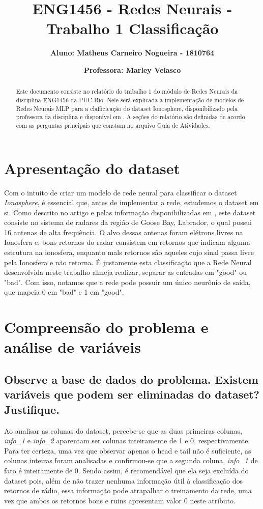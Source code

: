 \documentclass[12pt]{article}
\title{\textbf{ENG1456 - Redes Neurais - Trabalho 1 Classificação}}
\author{\textbf{Aluno: Matheus Carneiro Nogueira - 1810764}}
\affil{}
\author{\textbf{Professora: Marley Velasco}}
\affil{}
\date{}
\begin{document}
	\maketitle
	\tableofcontents
	
\begin{abstract}
	Este documento consiste no relatório do trabalho 1 do módulo de Redes Neurais da disciplina ENG1456 da PUC-Rio. Nele será explicada a implementação de modelos de Redes Neurais MLP para a clafficicação do dataset Ionosphere, disponibilizado pela professora da disciplina e disponível em \cite{Dataset}. A seções do relatório são definidas de acordo com as perguntas principais que constam no arquivo Guia de Atividades.
\end{abstract}

\section{Apresentação do dataset}\label{sec:apresentacao}

Com o intuito de criar um modelo de rede neural para classificar o dataset \textit{Ionosphere}, é essencial que, antes de implementar a rede, estudemos o dataset em si. Como descrito no artigo \cite{Paper1989} e pelas informação disponibilizadas em \cite{Dataset}, este dataset consiste no sistema de radares da região de Goose Bay, Labrador, o qual possui 16 antenas de alta frequência. O alvo dessas antenas foram elétrons livres na Ionosfera e, bons retornos do radar consistem em retornos que indicam alguma estrutura na ionosfera, enquanto mals retornos são aqueles cujo sinal passa livre pela Ionosfera e não retorna. É justamente esta classificação que a Rede Neural desenvolvida neste trabalho almeja realizar, separar as entradas em "good" ou "bad". Com isso, notamos que a rede pode possuir um único neurônio de saída, que mapeia 0 em "bad" e 1 em "good".

\section{Compreensão do problema e análise de variáveis}

\subsection{Observe a base de dados do problema. Existem variáveis que podem ser	eliminadas do dataset? Justifique.}\label{subsec:eliminadas}

Ao analisar as colunas do dataset, percebe-se que as duas primeiras colunas, \textit{info\_1} e \textit{info\_2} aparentam ser colunas inteiramente de 1 e 0, respectivamente. Para ter certeza, uma vez que observar apenas o head e tail não é suficiente, as colunas inteiras foram analisadas e confirmou-se que a segunda coluna, \textit{info\_1} de fato é inteiramente de 0. Sendo assim, é recomendável que ela seja excluída do dataset pois, além de não trazer nenhuma informação útil à classificação dos retornos de rádio, essa informação pode atrapalhar o treinamento da rede, uma vez que ambos os retornos bons e ruins apresentam valor 0 neste atributo.
\end{document}

